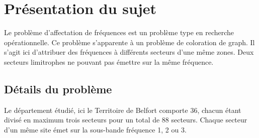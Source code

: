 \documentclass[a4paper, 12pt]{report}
\begin{document}
\chapter{Présentation du sujet}
Le problème d'affectation de fréquences est un problème type en recherche opérationnelle. Ce problème s'apparente à un problème de coloration de graph.
Il s'agit ici d'attribuer des fréquences à différents secteurs d'une même zones. Deux secteurs limitrophes ne pouvant pas émettre sur la même fréquence.

\section{Détails du problème}
Le département étudié, ici le Territoire de Belfort comporte 36, chacun étant divisé en maximum trois secteurs pour un total de 88 secteurs. Chaque secteur d'un même site émet sur la sous-bande fréquence 1, 2 ou 3. 
\end{document}
